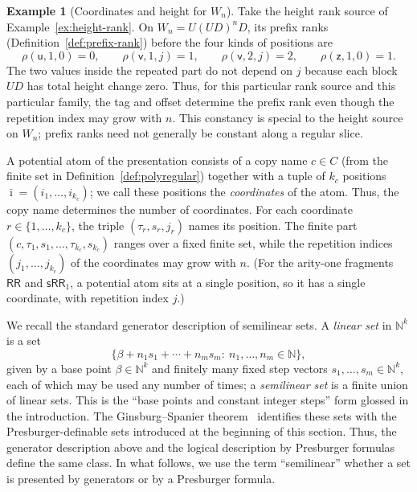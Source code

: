 \documentclass[11pt]{article}
\theoremstyle{definition}
\newtheorem{example}[theorem]{Example}
\newcommand{\N}{\mathbb N}
\newcommand{\RR}{\mathsf{RR}}
\newcommand{\SWR}{\mathsf{sRR}_1}
\begin{document}
\begin{example}[Coordinates and height for $W_n$]
\label{ex:slice-coordinates}
Take the height rank source of Example~\ref{ex:height-rank}.  On
$W_n=U(UD)^nD$, its prefix ranks (Definition~\ref{def:prefix-rank}) before the
four kinds of positions are
\[
   \rho(\mathsf u,1,0)=0,\qquad
   \rho(\mathsf v,1,j)=1,\qquad
   \rho(\mathsf v,2,j)=2,\qquad
   \rho(\mathsf z,1,0)=1.
\]
The two values inside the repeated part do not depend on $j$ because each
block $UD$ has total height change zero.  Thus, for this particular rank source
and this particular family, the tag and offset determine the prefix rank even
though the repetition index may grow with $n$.  This constancy is special to
the height source on $W_n$; prefix ranks need not generally be constant along
a regular slice.
\end{example}

A potential atom of the presentation consists of a copy name $c\in C$ (from
the finite set in Definition~\ref{def:polyregular}) together with a tuple of
$k_c$ positions $\bar\imath=(i_1,\ldots,i_{k_c})$; we call these positions the
\emph{coordinates} of the atom.  Thus, the copy name determines the number of
coordinates.  For each coordinate $r\in\{1,\ldots,k_c\}$, the triple
$(\tau_r,s_r,j_r)$ names its position.  The finite part
$(c,\tau_1,s_1,\ldots,\tau_{k_c},s_{k_c})$ ranges over a fixed finite set,
while the repetition indices
$(j_1,\ldots,j_{k_c})$ of the coordinates may grow with $n$.  (For the arity-one
fragments $\RR$ and $\SWR$, a potential atom sits at a single position, so it
has a single coordinate, with repetition index $j$.)

We recall the standard generator description of semilinear sets.  A
\emph{linear set} in $\N^k$ is a set
\[
   \{\beta+n_1 s_1+\cdots+n_m s_m:\ n_1,\ldots,n_m\in\N\},
\]
given by a base point $\beta\in\N^k$ and finitely many fixed step vectors
$s_1,\ldots,s_m\in\N^k$, each of which may be used any number of times; a
\emph{semilinear set} is a finite union of linear sets.  This is the ``base
points and constant integer steps'' form glossed in the introduction.
The Ginsburg--Spanier theorem~\cite{GinsburgSpanier1966} identifies these sets
with the Presburger-definable sets introduced at the beginning of this section.
Thus, the generator description above and the logical description by Presburger
formulas define the same class.  In what follows, we use the term
``semilinear'' whether a set is presented by generators or by a Presburger
formula.
\end{document}

